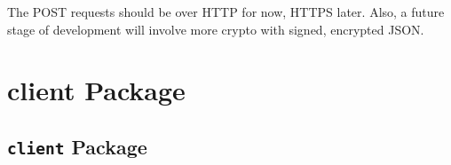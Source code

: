 \documentclass[letterpaper,10pt,english]{sphinxmanual}
\begin{document}
The POST requests should be over HTTP for now, HTTPS later. Also, a future stage of development will involve more crypto with signed, encrypted JSON.


\chapter{client Package}
\label{personis.client:client-package}\label{personis.client::doc}

\section{\texttt{client} Package}
\label{personis.client:id1}\label{personis.client:module-personis.client}
\end{document}
